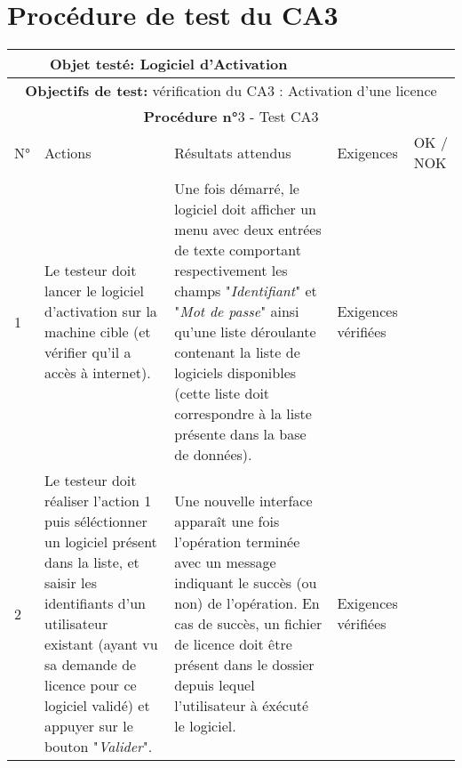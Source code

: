 \newpage

\section{Procédure de test du CA3}
\begin{table}[!h]
        \centering
        \begin{tabular}{|m{0.6cm}|
                         >{\raggedright\arraybackslash}m{4cm}|
                         >{\raggedright\arraybackslash}m{6.4cm}|
                         >{\raggedright\arraybackslash}m{2cm}|
                         m{1cm}|}
            \hline
            \multicolumn{3}{|c|}{
                \textbf{Objet testé: } Logiciel d'Activation 
            } & \multicolumn{2}{|c|}{
                \textbf{Version: } version    
            } \\
            \hline
            \multicolumn{5}{|c|}{\textbf{Objectifs de test:} 
                vérification du CA3 : Activation d'une licence} \\
            \hline
            \multicolumn{5}{|c|}{
                \textbf{Procédure n°}3 - Test CA3
            } \\
            \hline
            N° & Actions & Résultats attendus & Exigences & OK / NOK \\
            \hline      %
            1 & Le testeur doit lancer le logiciel d'activation sur la
                machine cible (et vérifier qu'il a accès à internet). 
              & Une fois démarré, le logiciel doit afficher un menu avec 
                deux entrées de texte comportant respectivement les champs
                "\emph{Identifiant}" et "\emph{Mot de passe}" ainsi qu'une liste
                déroulante contenant la liste de logiciels disponibles
                (cette liste doit correspondre à la liste présente dans
                 la base de données).
              & Exigences vérifiées & \\
            \hline
            2 & Le testeur doit réaliser l'action 1 puis séléctionner 
                un logiciel présent dans la liste, et saisir les 
                identifiants d'un utilisateur existant (ayant vu sa demande 
                de licence pour ce logiciel validé) et appuyer sur le bouton
                "\emph{Valider}".  
              & Une nouvelle interface apparaît une fois l'opération terminée
                avec un message indiquant le succès (ou non) de l'opération.
                En cas de succès, un fichier de licence doit être présent 
                dans le dossier depuis lequel l'utilisateur à éxécuté le logiciel. 
              & Exigences vérifiées & \\
            \hline
        \end{tabular} 
        \label{tab:tab3}
\end{table}
\newpage

